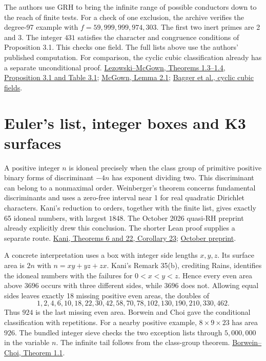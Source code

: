 \documentclass[11pt]{article}
\begin{document}
The authors use GRH to bring the infinite range of possible conductors down to the reach of finite tests. For a check of one exclusion, the archive verifies the degree-97 example with $f=59{,}999{,}999{,}974{,}303$. The first two inert primes are 2 and 3. The integer $431$ satisfies the character and congruence conditions of Proposition 3.1. This checks one field. The full lists above use the authors' published computation. For comparison, the cyclic cubic classification already has a separate unconditional proof. \href{https://arxiv.org/pdf/1601.03433}{Lezowski--McGown, Theorems 1.3--1.4, Proposition 3.1 and Table 3.1}; \href{https://www.numdam.org/article/JTNB_2012__24_2_425_0.pdf}{McGown, Lemma 2.1}; \href{https://arxiv.org/abs/2507.05862}{Bagger et al., cyclic cubic fields}.

\section{Euler's list, integer boxes and K3 surfaces}
A positive integer $n$ is idoneal precisely when the class group of primitive positive binary forms of discriminant $-4n$ has exponent dividing two. This discriminant can belong to a nonmaximal order. Weinberger's theorem concerns fundamental discriminants and uses a zero-free interval near 1 for real quadratic Dirichlet characters. Kani's reduction to orders, together with the finite list, gives exactly 65 idoneal numbers, with largest $1848$. The October 2026 quasi-RH preprint already explicitly drew this conclusion. The shorter Lean proof supplies a separate route. \href{https://mast.queensu.ca/~kani/papers/2011K1.pdf}{Kani, Theorems 6 and 22, Corollary 23}; \href{https://github.com/openai/math/tree/main/preprints/The-Quasi-Riemann-Hypothesis-October-5-2026}{October preprint}.

A concrete interpretation uses a box with integer side lengths $x,y,z$. Its surface area is $2n$ with $n=xy+yz+zx$. Kani's Remark 35(b), crediting Rains, identifies the idoneal numbers with the failures for $0<x<y<z$. Hence every even area above $3696$ occurs with three different sides, while $3696$ does not. Allowing equal sides leaves exactly 18 missing positive even areas, the doubles of
\[
 1,2,4,6,10,18,22,30,42,58,70,78,102,130,190,210,330,462.
\]
Thus $924$ is the last missing even area. Borwein and Choi gave the conditional classification with repetitions. For a nearby positive example, $8\times9\times23$ has area $926$. The bundled integer sieve checks the two exception lists through $5{,}000{,}000$ in the variable $n$. The infinite tail follows from the class-group theorem. \href{https://www.sfu.ca/~schoia/paper/rep.pdf}{Borwein--Choi, Theorem 1.1}.
\end{document}
